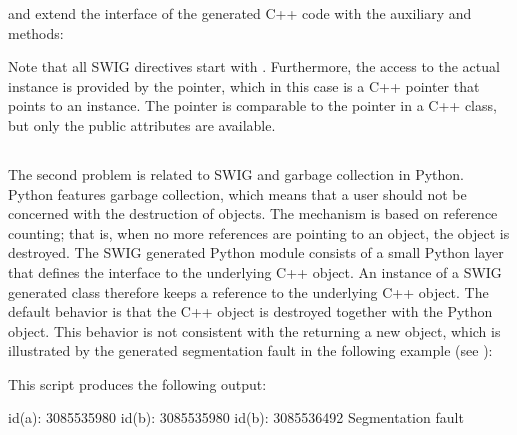 \pagebreak

\noindent and extend the interface of the generated C++ code with the auxiliary
 and  methods:\vspace*{2pt}

\vspace*{3pt}

\noindent Note that all SWIG directives start with . Furthermore, the
access to the actual instance is provided by the  pointer,
which in this case is a C++ pointer that points to an 
instance. The pointer is comparable to the  pointer in a C++
class, but only the public attributes are available.

\vspace*{3pt}
\subsection{}

The second problem is related to SWIG and garbage collection in Python.
Python features garbage collection, which means that a user should not
be concerned with the destruction of objects. The mechanism is based
on reference counting; that is, when no more references are pointing
to an object, the object is destroyed. The SWIG generated Python
module consists of a small Python layer that defines the interface
to the underlying C++ object. An instance of a SWIG generated class
therefore keeps a reference to the underlying C++ object. The default
behavior is that the C++ object is destroyed together with the Python
object. This behavior is not consistent with the  returning a new object, which is illustrated by the generated
segmentation fault in the following example (see ):\vspace*{2pt}


\vspace*{3pt}

This script produces the following output:\vspace*{3pt}
\begin{python}
id(a): 3085535980
id(b): 3085535980
id(b): 3085536492
Segmentation fault
\end{python}


